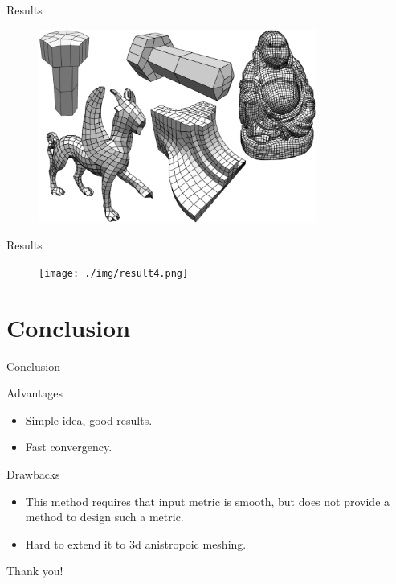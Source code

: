 \documentclass{beamer}
\begin{document}
\begin{frame}{Results}
\begin{figure}
\centering
\includegraphics[height=2.5in]{./img/result3.png}
\end{figure}
\end{frame}

\begin{frame}{Results}
\begin{figure}
\centering
\texttt{[image: ./img/result4.png]}
\end{figure}
\end{frame}


\section{Conclusion}
\begin{frame}{Conclusion}
\begin{block}{Advantages}
\begin{itemize}
\item Simple idea, good results.
\item Fast convergency.
\end{itemize}
\end{block}
\begin{block}{Drawbacks}
\begin{itemize}
\item This method requires that input metric is smooth, but does not provide a method to design such a metric.
\item Hard to extend it to 3d anistropoic meshing.
\end{itemize}
\end{block}
\end{frame}

\begin{frame}{}
\hspace{1.5in}\huge{Thank you!}
\end{frame}
\end{document}

